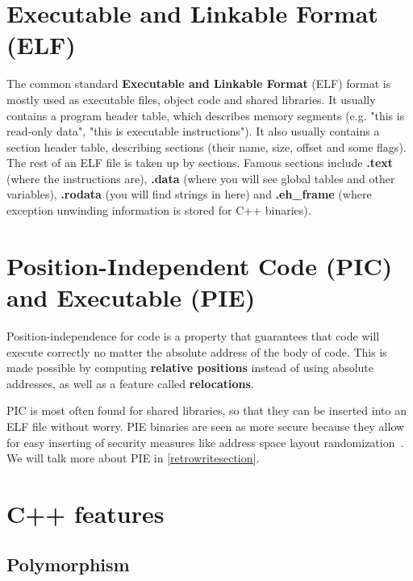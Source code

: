 \documentclass[a4paper,11pt,oneside]{report}
\begin{document}


\section{Executable and Linkable Format (ELF)}

The common standard \textbf{Executable and Linkable Format} (ELF) format is 
mostly used as executable files, object code and shared libraries.
It usually contains a program header table, which describes memory segments 
(e.g. "this is read-only data", "this is executable instructions").
It also usually contains a section header table, describing sections (their 
name, size, offset and some flags). 
The rest of an ELF file is taken up by sections.
Famous sections include
\textbf{.text} (where the instructions are),
\textbf{.data} (where you will see global tables and other variables),
\textbf{.rodata} (you will find strings in here)
and \textbf{.eh\_frame} (where exception unwinding information is stored for 
C++ binaries).

\section{Position-Independent Code (PIC) and Executable (PIE)}
\label{picpie}

Position-independence for code is a property that guarantees that code will 
execute correctly no matter the absolute address of the body of code.
This is made possible by computing \textbf{relative positions} instead of
using absolute addresses, as well as a feature called \textbf{relocations}.

PIC is most often found for shared libraries, so that they can be inserted into 
an ELF file without worry.
PIE binaries are seen as more secure because they allow for easy inserting of 
security measures like address space layout 
randomization~\cite{aslr}.
We will talk more about PIE in \autoref{retrowritesection}.

\section{C++ features}

\subsection{Polymorphism}
\label{polymorphism}
\end{document}
